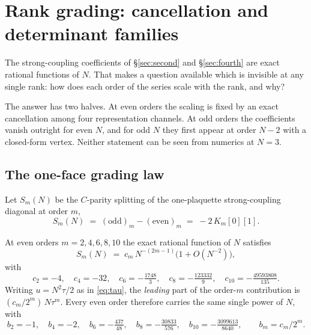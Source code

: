 \section{Rank grading: cancellation and determinant families}
\label{sec:grading}

The strong-coupling coefficients of \S\ref{sec:second} and
\S\ref{sec:fourth} are exact rational functions of $N$. That makes a
question available which is invisible at any single rank: how does each
order of the series scale with the rank, and why?

The answer has two halves. At even orders the scaling is fixed by an
exact cancellation among four representation channels. At odd orders
the coefficients vanish outright for even $N$, and for odd $N$ they
first appear at order $N-2$ with a closed-form vertex. Neither statement
can be seen from numerics at $N = 3$.

\subsection{The one-face grading law}

Let $S_m(N)$ be the $C$-parity splitting of the one-plaquette
strong-coupling diagonal at order $m$,
\begin{equation}
  S_m(N) \;=\; (\text{odd})_m - (\text{even})_m \;=\; -2\,K_m[0][1].
\end{equation}

\begin{theorem}
\label{thm:grading}
At even orders $m = 2, 4, 6, 8, 10$ the exact rational function of $N$
satisfies
\begin{equation}
  S_m(N) \;=\; c_m\, N^{-(2m-1)}\big(1 + O(N^{-2})\big),
  \label{eq:grading}
\end{equation}
with
\begin{equation}
  c_2 = -4, \quad c_4 = -32, \quad c_6 = -\tfrac{1748}{3},
  \quad c_8 = -\tfrac{123332}{9}, \quad c_{10} = -\tfrac{49593808}{135}.
\end{equation}
Writing $u = N^2\tau/2$ as in \eqref{eq:tau}, the \emph{leading} part of
the order-$m$ contribution is $(c_m/2^m)\, N \tau^m$. Every even order
therefore carries the same single power of $N$, with
\begin{equation}
  b_2 = -1, \quad b_4 = -2, \quad b_6 = -\tfrac{437}{48},
  \quad b_8 = -\tfrac{30833}{576}, \quad b_{10} = -\tfrac{3099613}{8640},
  \qquad b_m = c_m/2^m .
\end{equation}
\end{theorem}

